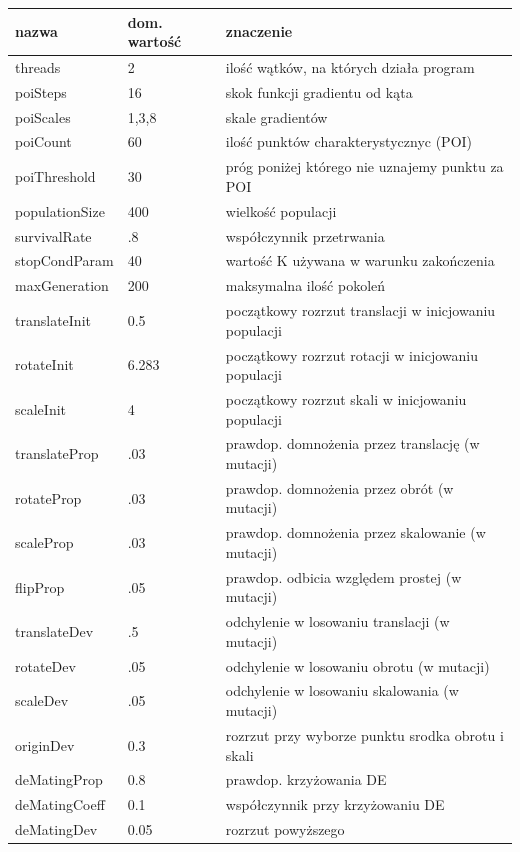 \documentclass[a4paper,12pt,leqno]{article}
\begin{document}
\begin{tabular}{l|l|l}
nazwa & dom. wartość & znaczenie \\
\hline
threads & 2 & ilość wątków, na których działa program \\
\hline
poiSteps & 16 & skok funkcji gradientu od kąta \\
poiScales & 1,3,8 & skale gradientów \\
poiCount & 60 & ilość punktów charakterystycznyc (POI) \\
poiThreshold & 30 & próg poniżej którego nie uznajemy punktu za POI \\
\hline
populationSize & 400 & wielkość populacji \\
survivalRate & .8 & współczynnik przetrwania \\
stopCondParam & 40 & wartość K używana w warunku zakończenia \\
maxGeneration & 200 & maksymalna ilość pokoleń \\
\hline
translateInit & 0.5 & początkowy rozrzut translacji w inicjowaniu populacji \\
rotateInit & 6.283 & początkowy rozrzut rotacji w inicjowaniu populacji \\
scaleInit & 4 & początkowy rozrzut skali w inicjowaniu populacji \\
\hline
translateProp & .03 & prawdop. domnożenia przez translację (w mutacji) \\
rotateProp & .03 & prawdop. domnożenia przez obrót (w mutacji) \\
scaleProp & .03 & prawdop. domnożenia przez skalowanie (w mutacji) \\
flipProp & .05 & prawdop. odbicia względem prostej (w mutacji) \\
\hline
translateDev & .5 & odchylenie w losowaniu translacji (w mutacji) \\
rotateDev & .05 & odchylenie w losowaniu obrotu (w mutacji) \\
scaleDev & .05 & odchylenie w losowaniu skalowania (w mutacji) \\
originDev & 0.3 & rozrzut przy wyborze punktu srodka obrotu i skali \\
\hline
deMatingProp & 0.8 & prawdop. krzyżowania DE \\
deMatingCoeff & 0.1 & współczynnik przy krzyżowaniu DE \\
deMatingDev & 0.05 & rozrzut powyższego \\
\end{tabular}
\end{document}
